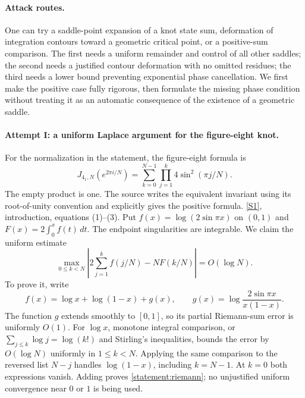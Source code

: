 \documentclass[11pt,a4paper]{article}
\newcommand{\sref}[2]{\hyperlink{source:#1:#2}{[S#2]}}
\numberwithin{equation}{section}
\begin{document}
\paragraph{Attack routes.}
One can try a saddle-point expansion of a knot state sum, deformation
of integration contours toward a geometric critical point, or a
positive-sum comparison.  The first needs a uniform remainder and control
of all other saddles; the second needs a justified contour deformation
with no omitted residues; the third needs a lower bound preventing
exponential phase cancellation.  We first make the positive case fully
rigorous, then formulate the missing phase condition without treating it
as an automatic consequence of the existence of a geometric saddle.

\paragraph{Attempt I: a uniform Laplace argument for the figure-eight knot.}
For the normalization in the statement, the figure-eight formula is
\begin{equation}\label{statement:sum}
 J_{4_1,N}(e^{2\pi i/N})=
 \sum_{k=0}^{N-1}\prod_{j=1}^{k}4\sin^2(\pi j/N).
\end{equation}
The empty product is one.  The source writes the equivalent invariant
using its root-of-unity convention and explicitly gives the positive
formula. \sref{statement}{1}, introduction, equations (1)--(3).
Put $f(x)=\log(2\sin\pi x)$ on $(0,1)$ and
$F(x)=2\int_0^x f(t)\,dt$.  The endpoint singularities are integrable.
We claim the uniform estimate
\begin{equation}\label{statement:riemann}
 \max_{0\leq k<N}\left|
 2\sum_{j=1}^k f(j/N)-NF(k/N)\right|=O(\log N).
\end{equation}
To prove it, write
\[
 f(x)=\log x+\log(1-x)+g(x),\qquad
 g(x)=\log\frac{2\sin\pi x}{x(1-x)}.
\]
The function $g$ extends smoothly to $[0,1]$, so its partial Riemann-sum
error is uniformly $O(1)$.  For $\log x$, monotone integral comparison,
or $\sum_{j\leq k}\log j=\log(k!)$ and Stirling's inequalities, bounds
the error by $O(\log N)$ uniformly in $1\leq k<N$.  Applying the same
comparison to the reversed list $N-j$ handles $\log(1-x)$, including
$k=N-1$.  At $k=0$ both expressions vanish.  Adding proves
\eqref{statement:riemann}; no unjustified uniform convergence near $0$ or $1$
is being used.
\end{document}
